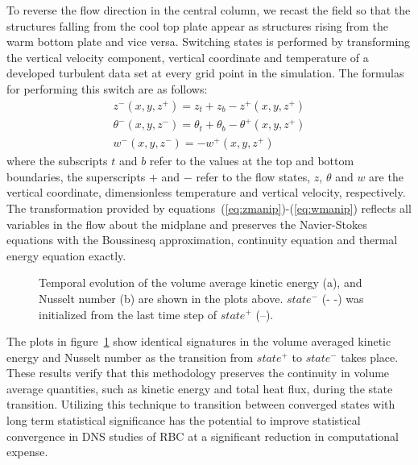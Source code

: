 \documentclass[twocolumn,10pt]{tsfp}
\begin{document}
To reverse the flow direction in the central column, we recast the field so that the structures falling from the cool top plate appear as structures rising from the warm bottom plate and vice versa.  Switching states is performed by transforming the vertical velocity component, vertical coordinate and temperature of a developed turbulent data set at every grid point in the simulation.   The formulas for performing this switch are as follows:
\begin{gather}
z^-(x,y,z^+)=z_{t}+z_{b}-z^+(x,y,z^+)
\label{eq:zmanip} \\
\theta^-(x,y,z^-)=\theta_{t}+\theta_{b}-\theta^+(x,y,z^+)
\label{eq:tmanip}\\
w^-(x,y,z^-)=-w^+(x,y,z^+)
\label{eq:wmanip}
\end{gather}
where the subscripts $t$ and $b$ refer to the values at the top and bottom boundaries, the superscripts $+$ and $-$ refer to the flow states, $z$, $\theta$ and $w$ are the vertical coordinate, dimensionless temperature and vertical velocity, respectively.  The transformation provided by equations~(\ref{eq:zmanip})-(\ref{eq:wmanip}) reflects all variables in the flow about the midplane and preserves the Navier-Stokes equations with the Boussinesq approximation, continuity equation and thermal energy equation exactly. 
\begin{figure}
\centering
{}
\caption{Temporal evolution of the volume average kinetic energy (a), and Nusselt number (b) are shown in the plots above.  $state^-$ (- -) was initialized from the last time step of $state^+$ (--). }
\label{fig:volstat}
\end{figure}
The plots in figure~\ref{fig:volstat} show identical signatures in the volume averaged kinetic energy and Nusselt number as the transition from $state^+$ to $state^-$ takes place.  These results verify that this methodology preserves the continuity in volume average quantities, such as kinetic energy and total heat flux, during the state transition.
Utilizing this technique to transition between converged states with long term statistical significance has the potential to improve statistical convergence in DNS studies of RBC at a significant reduction in computational expense.  
 
\end{document}
